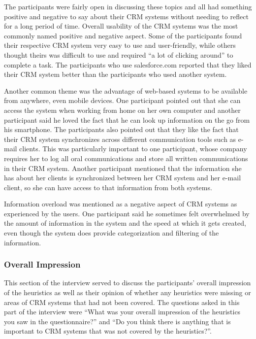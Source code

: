 The participants were fairly open in discussing these topics and all had something positive and negative to say about their CRM systems without needing to reflect for a long period of time. Overall usability of the CRM systems was the most commonly named positive and negative aspect. Some of the participants found their respective CRM system very easy to use and user-friendly, while others thought theirs was difficult to use and required ``a lot of clicking around'' to complete a task. The participants who use salesforce.com reported that they liked their CRM system better than the participants who used another system.

Another common theme was the advantage of web-based systems to be available from anywhere, even mobile devices. One participant pointed out that she can access the system when working from home on her own computer and another participant said he loved the fact that he can look up information on the go from his smartphone. The participants also pointed out that they like the fact that their CRM system synchronizes across different communication tools such as e-mail clients. This was particularly important to one participant, whose company requires her to log all oral communications and store all written communications in their CRM system. Another participant mentioned that the information she has about her clients is synchronized between her CRM system and her e-mail client, so she can have access to that information from both systems.

Information overload was mentioned as a negative aspect of CRM systems as experienced by the users. One participant said he sometimes felt overwhelmed by the amount of information in the system and the speed at which it gets created, even though the system does provide categorization and filtering of the information.

\subsubsection{Overall Impression}
This section of the interview served to discuss the participants' overall impression of the heuristics as well as their opinion of whether any heuristics were missing or areas of CRM systems that had not been covered. The questions asked in this part of the interview were ``What was your overall impression of the heuristics you saw in the questionnaire?'' and ``Do you think there is anything that is important to CRM systems that was not covered by the heuristics?''.

